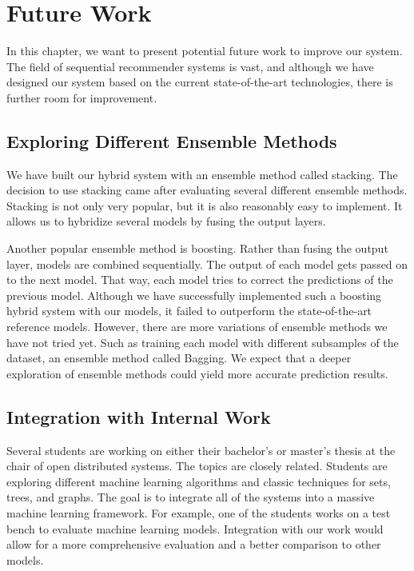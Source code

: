 \chapter{Future Work}
In this chapter, we want to present potential future work to improve our system. The field of sequential recommender systems is vast, and although we have designed our system based on the current state-of-the-art technologies, there is further room for improvement.

\section{Exploring Different Ensemble Methods}
We have built our hybrid system with an ensemble method called stacking. The decision to use stacking came after evaluating several different ensemble methods. Stacking is not only very popular, but it is also reasonably easy to implement. It allows us to hybridize several models by fusing the output layers. 

Another popular ensemble method is boosting. Rather than fusing the output layer, models are combined sequentially. The output of each model gets passed on to the next model. That way, each model tries to correct the predictions of the previous model. Although we have successfully implemented such a boosting hybrid system with our models, it failed to outperform the state-of-the-art reference models. However, there are more variations of ensemble methods we have not tried yet. Such as training each model with different subsamples of the dataset, an ensemble method called Bagging. We expect that a deeper exploration of ensemble methods could yield more accurate prediction results.

\section{Integration with Internal Work}
Several students are working on either their bachelor's or master's thesis at the chair of open distributed systems. The topics are closely related. Students are exploring different machine learning algorithms and classic techniques for sets, trees, and graphs. The goal is to integrate all of the systems into a massive machine learning framework. For example, one of the students works on a test bench to evaluate machine learning models. Integration with our work would allow for a more comprehensive evaluation and a better comparison to other models. 

%
% 
% 

